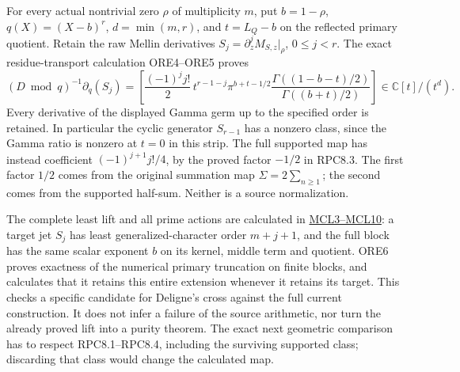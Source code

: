 For every actual nontrivial zero \(\rho\) of multiplicity \(m\), put
\(b=1-\rho\), \(q(X)=(X-b)^r\), \(d=\min(m,r)\), and \(t=L_Q-b\) on the
reflected primary quotient. Retain the raw Mellin derivatives
\(S_j=\partial_z^jM_{S,z}|_\rho\), \(0\le j<r\). The exact
residue-transport calculation ORE4--ORE5 proves \[
(D\bmod q)^{-1}\partial_q(S_j)=
\left[\frac{(-1)^j j!}{2}\,t^{r-1-j}
\pi^{b+t-1/2}\frac{\Gamma((1-b-t)/2)}{\Gamma((b+t)/2)}\right]
\in\mathbb C[t]/(t^d).
\tag{RPC8.4}
\] Every derivative of the displayed Gamma germ up to the specified
order is retained. In particular the cyclic generator \(S_{r-1}\) has a
nonzero class, since the Gamma ratio is nonzero at \(t=0\) in this
strip. The full supported map has instead coefficient
\((-1)^{j+1}j!/4\), by the proved factor \(-1/2\) in RPC8.3. The first
factor \(1/2\) comes from the original summation map
\(\Sigma=2\sum_{n\ge1}\); the second comes from the supported half-sum.
Neither is a source normalization.

The complete least lift and all prime actions are calculated in
\href{ORIGINAL_MELLIN_CHARACTER_LIFTING.md}{MCL3--MCL10}: a target jet
\(S_j\) has least generalized-character order \(m+j+1\), and the full
block has the same scalar exponent \(b\) on its kernel, middle term and
quotient. ORE6 proves exactness of the numerical primary truncation on
finite blocks, and calculates that it retains this entire extension
whenever it retains its target. This checks a specific candidate for
Deligne's cross against the full current construction. It does not infer
a failure of the source arithmetic, nor turn the already proved lift
into a purity theorem. The exact next geometric comparison has to
respect RPC8.1--RPC8.4, including the surviving supported class;
discarding that class would change the calculated map.
